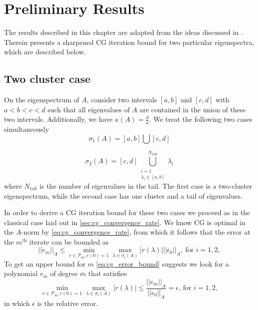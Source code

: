 \chapter{Preliminary Results}\label{ch:preliminary_results}\newpage
The results described in this chapter are adapted from the ideas discussed in \cite[Section 4]{cg_sharpened_convrate_Axelsson1976}. Therein \citeauthor{cg_sharpened_convrate_Axelsson1976} presents a sharpened CG iteration bound for two particular eigenspectra, which are described below.

\section{Two cluster case}\label{sec:cg_sharpened_convrate}
On the eigenspectrum of $A$, consider two intervals $[a, b]$ and $[c, d]$ with $a < b < c < d$ such that all eigenvalues of $A$ are contained in the union of these two intervals. Additionally, we have $\kappa(A) = \frac{d}{a}$. We treat the following two cases simultaneously
\begin{equation}
    \sigma_1(A) = [a,b] \bigcup [c,d]
    \label{eq:two_clusters}
\end{equation}

\begin{equation}
    \sigma_2(A) = [c,d] \bigcup_{\substack{i=1 \\ \lambda_i \in [a,b]}}^{N_{\text{tail}}} \lambda_i
    \label{eq:one_cluster_with_tail}
\end{equation}
where $N_{\text{tail}}$ is the number of eigenvalues in the tail. The first case is a two-cluster eigenspectrum, while the second case has one cluster and a tail of eigenvalues. 

In order to derive a CG iteration bound for these two cases we proceed as in the classical case laid out in \ref{sec:cg_convergence_rate}. We know CG is optimal in the $A$-norm by \cref{eq:cg_convergence_rate}, from which it follows that the error at the $m^{\text{th}}$ iterate can be bounded as 
\begin{equation}
    ||e_m||_A \leq \min_{r\in \mathcal{P}_{m}, r(0) = 1} \max_{\lambda \in \sigma_i(A)} |r(\lambda)| ||\epsilon_0||_A, \ \text{for } i = 1,2,
    \label{eq:cg_error_bound}
\end{equation}
To get an upper bound for $m$ \cref{eq:cg_error_bound} suggests we look for a polynomial $r_{\bar{m}}$ of degree $\bar{m}$ that satisfies
\[
    \min_{r \in \mathcal{P}_{\bar{m}}, r(0) = 1} \max_{\lambda \in \sigma_i(A)} |r(\lambda)| \leq \frac{||e_{m}||_A}{||\epsilon_0||_A} = \epsilon \text{, for } i = 1,2, 
\]
in which $\epsilon$ is the relative error. 

